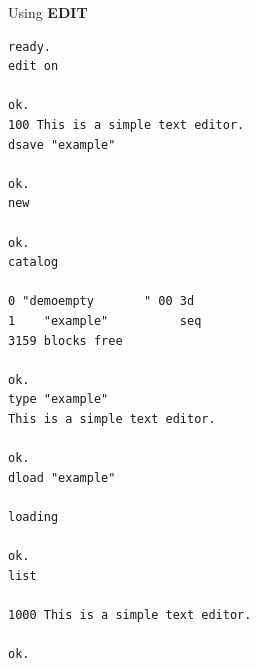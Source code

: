 \begin{description}[leftmargin=2cm,style=nextline]
\item [Example:] Using {\bf EDIT}
\begin{tcolorbox}[colback=black,coltext=white]
\verbatimfont{\codefont}
\begin{verbatim}
ready.
edit on

ok.
100 This is a simple text editor.
dsave "example"

ok.
new

ok.
catalog

0 "demoempty       " 00 3d
1    "example"          seq
3159 blocks free

ok.
type "example"
This is a simple text editor.

ok.
dload "example"

loading

ok.
list

1000 This is a simple text editor.

ok.
\end{verbatim}
\end{tcolorbox}
\end{description}


\newpage
